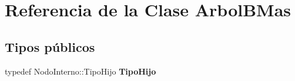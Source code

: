 \hypertarget{class_arbol_b_mas}{\section{\-Referencia de la \-Clase \-Arbol\-B\-Mas}
\label{class_arbol_b_mas}
}
\subsection*{\-Tipos públicos}
\begin{DoxyCompactItemize}
\item 
\hypertarget{class_arbol_b_mas_a0b2441df3bd1460d48bb116f0cf3caba}{typedef \-Nodo\-Interno\-::\-Tipo\-Hijo {\bfseries \-Tipo\-Hijo}}\label{class_arbol_b_mas_a0b2441df3bd1460d48bb116f0cf3caba}

\end{DoxyCompactItemize}
